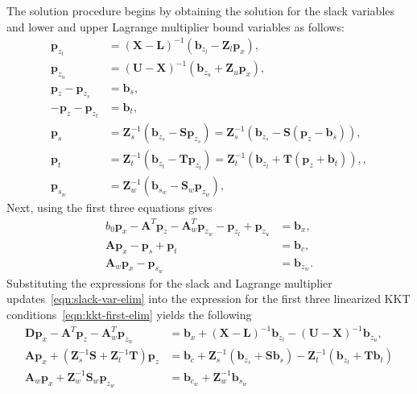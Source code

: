 \documentclass[12pt]{article}
\newcommand{\mb}{\mathbf}
\begin{document}
The solution procedure begins by obtaining the solution for the slack variables and lower and upper Lagrange multiplier bound variables as follows:
%
\begin{equation}
  \label{eqn:slack-var-elim}
  \begin{aligned}
    \mb{p}_{z_{l}} &= (\mb{X} - \mb{L})^{-1}(\mb{b}_{z_{l}} - \mb{Z}_{l} \mb{p}_{x} ), \\
    \mb{p}_{z_{u}} &= (\mb{U} - \mb{X})^{-1}(\mb{b}_{z_{u}} + \mb{Z}_{u} \mb{p}_{x} ), \\
    \mb{p}_{z} - \mb{p}_{z_{s}} &= \mb{b}_{s}, \\
    -\mb{p}_{z} - \mb{p}_{z_{t}} &= \mb{b}_{t}, \\
    \mb{p}_{s} &= \mb{Z}_{s}^{-1}(\mb{b}_{z_{s}} - \mb{S}\mb{p}_{z_{s}}) = \mb{Z}_{s}^{-1}(\mb{b}_{z_{s}} - \mb{S}(\mb{p}_{z} - \mb{b}_{s})), \\
    \mb{p}_{t} &= \mb{Z}_{t}^{-1}(\mb{b}_{z_{t}} - \mb{T}\mb{p}_{z_{t}}) = \mb{Z}_{t}^{-1}(\mb{b}_{z_{t}} + \mb{T}(\mb{p}_{z} + \mb{b}_{t})),, \\
    \mb{p}_{s_{w}} &= \mb{Z}_{w}^{-1}(\mb{b}_{s_{w}} - \mb{S}_{w} \mb{p}_{z_{w}}),
  \end{aligned}
\end{equation}
Next, using the first three equations gives
\begin{equation}
  \label{eqn:kkt-first-elim}
  \begin{aligned}
    b_{0} \mb{p}_{x} - \mb{A}^{T}\mb{p}_{z} - \mb{A}_{w}^{T}\mb{p}_{z_{w}} - \mb{p}_{z_{l}} + \mb{p}_{z_{u}} & = \mb{b}_{x}, \\
    \mb{A} \mb{p}_{x} - \mb{p}_{s} + \mb{p}_{t} &= \mb{b}_{c}, \\
    \mb{A}_{w} \mb{p}_{x} - \mb{p}_{s_{w}} & = \mb{b}_{z_{w}}.
  \end{aligned}
\end{equation}
Substituting the expressions for the slack and Lagrange multiplier updates~\eqref{eqn:slack-var-elim} into the expression for the first three linearized KKT conditions~\eqref{eqn:kkt-first-elim} yields the following
%
\begin{equation}
  \label{eqn:kkt-x-lagrange}
  \begin{aligned}
    \mb{D} \mb{p}_{x} - \mb{A}^{T}\mb{p}_{z} - \mb{A}_{w}^{T}\mb{p}_{z_{w}} &=
    \mb{b}_{x} + (\mb{X} - \mb{L})^{-1}\mb{b}_{z_{l}} - (\mb{U} - \mb{X})^{-1}\mb{b}_{z_{u}}, \\
    \mb{A}\mb{p}_{x} + (\mb{Z}_{s}^{-1}\mb{S} + \mb{Z}_{t}^{-1}\mb{T}) \mb{p}_{z} &=
    \mb{b}_{c} + \mb{Z}_{s}^{-1}(\mb{b}_{z_{s}} + \mb{S}\mb{b}_{s}) - \mb{Z}_{t}^{-1}(\mb{b}_{z_{t}} + \mb{T}\mb{b}_{t})\\
    \mb{A}_{w} \mb{p}_{x} + \mb{Z}_{w}^{-1}\mb{S}_{w} \mb{p}_{z_{w}} & =
    \mb{b}_{c_{w}} + \mb{Z}_{w}^{-1}\mb{b}_{s_{w}} \\
    \end{aligned}
\end{equation}
\end{document}
